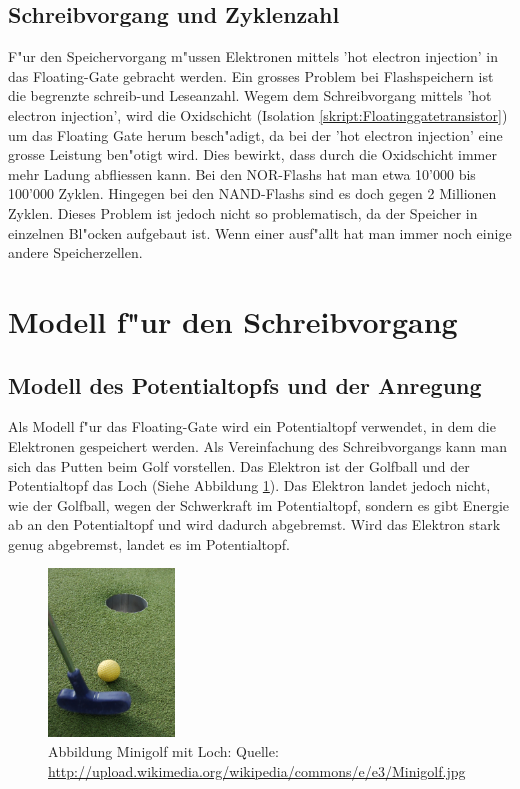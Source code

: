 \begin{refsection}
\subsection{Schreibvorgang und Zyklenzahl}
F"ur den Speichervorgang m"ussen Elektronen mittels 'hot electron injection'
in das Floating-Gate gebracht werden. Ein grosses Problem bei
Flashspeichern ist die begrenzte schreib-und Leseanzahl.
Wegem dem Schreibvorgang mittels 'hot electron injection', wird die
Oxidschicht (Isolation \ref{skript:Floatinggatetransistor}) um das Floating Gate herum
besch"adigt, da bei der 'hot electron injection' eine grosse Leistung
ben"otigt wird.
Dies bewirkt, dass durch die Oxidschicht immer mehr Ladung abfliessen kann.
Bei den NOR-Flashs hat man etwa 10'000 bis 100'000 Zyklen.
Hingegen bei den NAND-Flashs sind es doch gegen 2 Millionen Zyklen.
Dieses Problem ist jedoch nicht so problematisch, da der Speicher in
einzelnen Bl"ocken aufgebaut ist.
Wenn einer ausf"allt hat man immer noch einige andere Speicherzellen.

\section{Modell f"ur den Schreibvorgang}
\subsection{Modell des Potentialtopfs und der Anregung}
Als Modell f"ur das Floating-Gate wird ein Potentialtopf verwendet,
in dem die Elektronen gespeichert werden.
Als Vereinfachung des Schreibvorgangs kann man sich das Putten beim
Golf vorstellen.
Das Elektron ist der Golfball und der Potentialtopf das Loch (Siehe Abbildung \ref{skript:Minigolf}).
Das Elektron landet jedoch nicht, wie der Golfball, wegen der Schwerkraft
im Potentialtopf, sondern es gibt Energie ab an den Potentialtopf und
wird dadurch abgebremst.
Wird das Elektron stark genug abgebremst, landet es im Potentialtopf.

\begin{figure}
\centering
\includegraphics[width=0.3\textwidth]{flash/graphics/Minigolf.jpg}
\caption{Abbildung Minigolf mit Loch: Quelle:
\url{http://upload.wikimedia.org/wikipedia/commons/e/e3/Minigolf.jpg}
\label{skript:Minigolf}}
\end{figure}


\end{refsection}
